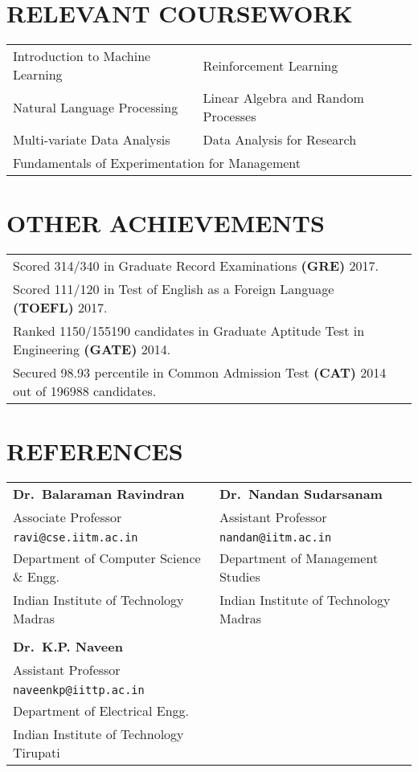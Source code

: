 \documentclass[margin,11pt]{res}
\begin{document}
\begin{resume}
\section{RELEVANT COURSEWORK}
\begin{tabular}{ll}
Introduction to Machine Learning & Reinforcement Learning  \\
Natural Language Processing & Linear Algebra and Random Processes \\
Multi-variate Data Analysis & Data Analysis for Research \\
\multicolumn{2}{l}{Fundamentals of Experimentation for Management}
\end{tabular}

\section{OTHER ACHIEVEMENTS}
\begin{tabular}{ll}
Scored 314/340 in Graduate Record Examinations \textbf{(GRE)} 2017.\\
Scored 111/120 in Test of English as a Foreign Language \textbf{(TOEFL)} 2017.\\
Ranked 1150/155190 candidates in Graduate Aptitude Test in Engineering \textbf{(GATE)} 2014. \\
Secured 98.93 percentile in Common Admission Test \textbf{(CAT)} 2014 out of 196988 candidates.
\end{tabular}

\section{REFERENCES}
\begin{tabular}{lll}
\textbf{Dr.~Balaraman Ravindran} & \textbf{Dr.~Nandan Sudarsanam} \\
Associate Professor & Assistant Professor\\
\texttt{ravi@cse.iitm.ac.in} & \texttt{nandan@iitm.ac.in}\\
Department of Computer Science \& Engg. & Department of Management Studies\\ 
Indian Institute of Technology Madras & Indian Institute of Technology Madras\\
\\
\textbf{Dr.~K.P. Naveen} \\
Assistant Professor\\
\texttt{naveenkp@iittp.ac.in}\\
Department of Electrical Engg.\\ 
Indian Institute of Technology Tirupati

\end{tabular}



\end{resume}
\end{document}
